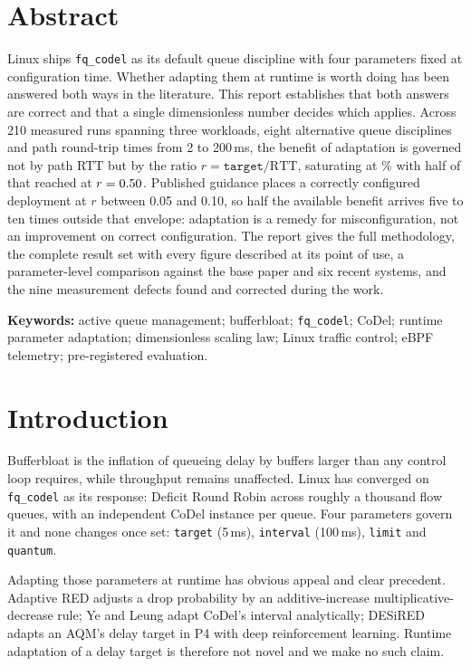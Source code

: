 \documentclass[11pt,a4paper]{article}
\begin{document}
\section*{Abstract}
\noindent
Linux ships \texttt{fq\_codel} as its default queue discipline with four
parameters fixed at configuration time. Whether adapting them at runtime is
worth doing has been answered both ways in the literature. This report
establishes that both answers are correct and that a single dimensionless
number decides which applies. Across 210 measured runs spanning three
workloads, eight alternative queue disciplines and path round-trip times from
2 to 200\,ms, the benefit of adaptation is governed not by path RTT but by the
ratio $r=\texttt{target}/\mathrm{RTT}$, saturating at \LawCeiling\% with half
of that reached at $r=0.50$. Published guidance places a correctly
configured deployment at $r$ between 0.05 and 0.10, so half the available
benefit arrives five to ten times outside that envelope: adaptation is a
remedy for misconfiguration, not an improvement on correct
configuration. The report gives the full methodology, the complete result set
with every figure described at its point of use, a parameter-level comparison
against the base paper and six recent systems, and the nine measurement
defects found and corrected during the work.

\vspace{0.8em}
\noindent\textbf{Keywords:} active queue management; bufferbloat;
\texttt{fq\_codel}; CoDel; runtime parameter adaptation; dimensionless
scaling law; Linux traffic control; eBPF telemetry; pre-registered evaluation.

\newpage
\tableofcontents
\newpage
\listoffigures
\newpage
\listoftables
\newpage

\section{Introduction}

Bufferbloat is the inflation of queueing delay by buffers larger than any
control loop requires, while throughput remains unaffected. Linux has
converged on \texttt{fq\_codel} as its response: Deficit Round Robin across
roughly a thousand flow queues, with an independent CoDel instance per queue.
Four parameters govern it and none changes once set: \texttt{target} (5\,ms),
\texttt{interval} (100\,ms), \texttt{limit} and \texttt{quantum}.

Adapting those parameters at runtime has obvious appeal and clear precedent.
Adaptive RED adjusts a drop probability by an additive-increase
multiplicative-decrease rule; Ye and Leung adapt CoDel's interval
analytically; DESiRED adapts an AQM's delay target in P4 with deep
reinforcement learning. Runtime adaptation of a delay target is therefore not
novel and we make no such claim.
\end{document}
